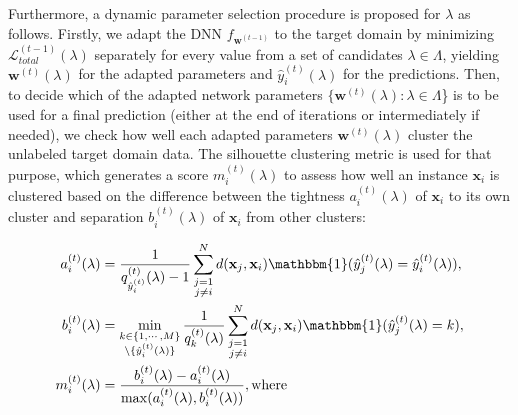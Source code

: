 \documentclass[12pt]{iopart}
\newcommand{\matr}[1]{\mathbf{#1}}
\begin{document}
Furthermore, a dynamic parameter selection procedure is proposed for $\lambda$ as follows. Firstly, we adapt the DNN $f_{\matr{w}^{(t-1)}}$ to the target domain by minimizing $\mathcal{L}_{{total}}^{(t-1)}(\lambda)$ separately for every value from a set of candidates $\lambda \in \Lambda$, yielding $\matr{w}^{(t)}(\lambda)$ for the adapted parameters and $\hat{y}^{(t)}_i(\lambda)$ for the predictions. Then, to decide which of the adapted network parameters $\{\matr{w}^{(t)}(\lambda): \lambda \in \Lambda$\} is to be used for a final prediction (either at the end of iterations or intermediately if needed), we check how well each adapted parameters $\matr{w}^{(t)}(\lambda)$ cluster the unlabeled target domain data. The silhouette clustering metric \cite{silhouette} is used for that purpose, which generates a score $m_i^{(t)}({\lambda})$ to assess how well an instance $\matr{x}_i$ is clustered based on the difference between the tightness $a_i^{(t)}({\lambda})$ of $\matr{x}_i$ to its own cluster and separation $b_i^{(t)}({\lambda})$ of $\matr{x}_i$ from other clusters: 

\begin{align}
    a_i^{(t)}({\lambda}) &={\frac{1}{q^{(t)}_{\hat{y}_{i}^{(t)}}({\lambda})-1}} \sum_{\substack{j=1 \\ j\neq i}}^{N} d(\matr{x}_j,\matr{x}_i)\mathbbm{1}(\hat{y}_{j}^{(t)}({\lambda})=\hat{y}_{i}^{(t)}({\lambda})), \nonumber \\
    b_i^{(t)}({\lambda}) &=\min_{\substack{k \in \{1,\cdots,M\} \\ \backslash \{\hat{y}_{i}^{(t)}({\lambda})\}}} \frac{1}{q_k^{(t)}(\lambda)} \sum_{\substack{j=1 \\ j\neq i}}^{N} d(\matr{x}_j,\matr{x}_i)\mathbbm{1}(\hat{y}^{(t)}_{j}({\lambda})=k), \nonumber \\
    m_i^{(t)}({\lambda}) &= \frac{b_i^{(t)}({\lambda})-a_i^{(t)}({\lambda})}{\max(a_i^{(t)}({\lambda}),b_i^{(t)}({\lambda}))}, \text{where}
    \label{eq:silhouette}
\end{align}
\end{document}
